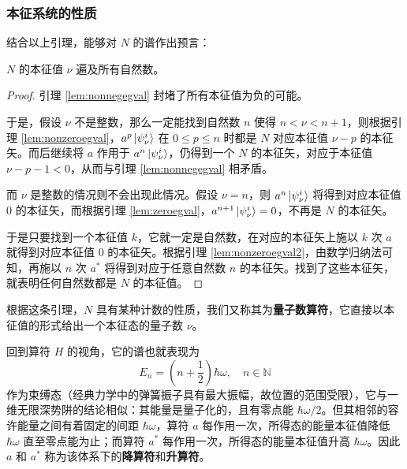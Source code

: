 \documentclass[cn,10pt,math=newtx,citestyle=gb7714-2015,bibstyle=gb7714-2015]{elegantbook}
\def\N{\mathbb N}
\begin{document}
\subsubsection{本征系统的性质}

结合以上引理，能够对 $N$ 的谱作出预言：
\begin{theorem}[$N$ 的本征值的取值范围]
   $N$ 的本征值 $\nu$ 遍及所有自然数。
\end{theorem}
\begin{proof}
    引理 \ref{lem:nonnegegval} 封堵了所有本征值为负的可能。
    
    于是，假设 $\nu$ 不是整数，那么一定能找到自然数 $n$ 使得 $n<\nu<n+1$，则根据引理 \ref{lem:nonzeroegval}，$a^p\ket{\psi_\nu^i}$ 在 $0\le p\le n$ 时都是 $N$ 对应本征值 $\nu-p$ 的本征矢。而后继续将 $a$ 作用于 $a^n\ket{\psi_\nu^i}$，仍得到一个 $N$ 的本征矢，对应于本征值 $\nu-p-1<0$，从而与引理 \ref{lem:nonnegegval} 相矛盾。
    
    而 $\nu$ 是整数的情况则不会出现此情况。假设 $\nu = n$，则 $a^n\ket{\psi_\nu^i}$ 将得到对应本征值 0 的本征矢，而根据引理 \ref{lem:zeroegval}，$a^{n+1}\ket{\psi_\nu^i}=0$，不再是 $N$ 的本征矢。
    
    于是只要找到一个本征值 $k$，它就一定是自然数，在对应的本征矢上施以 $k$ 次 $a$ 就得到对应本征值 0 的本征矢。根据引理 \ref{lem:nonzeroegval2}，由数学归纳法可知，再施以 $n$ 次 $a^*$ 将得到对应于任意自然数 $n$ 的本征矢。找到了这些本征矢，就表明任何自然数都是 $N$ 的本征值。
\end{proof}

根据这条引理，$N$ 具有某种计数的性质，我们又称其为\textbf{量子数算符}，它直接以本征值的形式给出一个本征态的量子数 $\nu$。

回到算符 $H$ 的视角，它的谱也就表现为
\begin{equation}
    E_n=\left(n+\frac 1 2\right)\hbar\omega,\quad n\in\N
\end{equation}
作为束缚态（经典力学中的弹簧振子具有最大振幅，故位置的范围受限），它与一维无限深势阱的结论相似：其能量是量子化的，且有零点能 $\hbar\omega/2$。但其相邻的容许能量之间有着固定的间距 $\hbar\omega$，算符 $a$ 每作用一次，所得态的能量本征值降低 $\hbar\omega$ 直至零点能为止；而算符 $a^*$ 每作用一次，所得态的能量本征值升高 $\hbar\omega$。因此 $a$ 和 $a^*$ 称为该体系下的\textbf{降算符}和\textbf{升算符}。 
\end{document}
